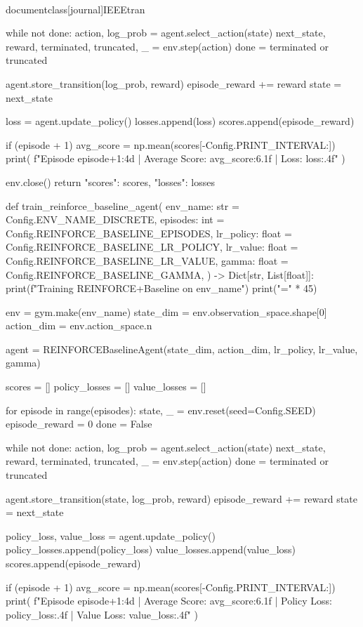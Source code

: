 \\documentclass[journal]{IEEEtran}
\begin{document}
        while not done:
            action, log_prob = agent.select_action(state)
            next_state, reward, terminated, truncated, _ = env.step(action)
            done = terminated or truncated

            agent.store_transition(log_prob, reward)
            episode_reward += reward
            state = next_state

        loss = agent.update_policy()
        losses.append(loss)
        scores.append(episode_reward)

        if (episode + 1) %
            avg_score = np.mean(scores[-Config.PRINT_INTERVAL:])
            print(
                f"Episode {episode+1:4d} | Average Score: {avg_score:6.1f} | Loss: {loss:.4f}"
            )

    env.close()
    return {"scores": scores, "losses": losses}

def train_reinforce_baseline_agent(
    env_name: str = Config.ENV_NAME_DISCRETE,
    episodes: int = Config.REINFORCE_BASELINE_EPISODES,
    lr_policy: float = Config.REINFORCE_BASELINE_LR_POLICY,
    lr_value: float = Config.REINFORCE_BASELINE_LR_VALUE,
    gamma: float = Config.REINFORCE_BASELINE_GAMMA,
) -> Dict[str, List[float]]:
    print(f"Training REINFORCE+Baseline on {env_name}")
    print("=" * 45)

    env = gym.make(env_name)
    state_dim = env.observation_space.shape[0]
    action_dim = env.action_space.n

    agent = REINFORCEBaselineAgent(state_dim, action_dim, lr_policy, lr_value, gamma)

    scores = []
    policy_losses = []
    value_losses = []

    for episode in range(episodes):
        state, _ = env.reset(seed=Config.SEED)
        episode_reward = 0
        done = False

        while not done:
            action, log_prob = agent.select_action(state)
            next_state, reward, terminated, truncated, _ = env.step(action)
            done = terminated or truncated

            agent.store_transition(state, log_prob, reward)
            episode_reward += reward
            state = next_state

        policy_loss, value_loss = agent.update_policy()
        policy_losses.append(policy_loss)
        value_losses.append(value_loss)
        scores.append(episode_reward)

        if (episode + 1) %
            avg_score = np.mean(scores[-Config.PRINT_INTERVAL:])
            print(
                f"Episode {episode+1:4d} | Average Score: {avg_score:6.1f} | Policy Loss: {policy_loss:.4f} | Value Loss: {value_loss:.4f}"
            )
\end{document}
